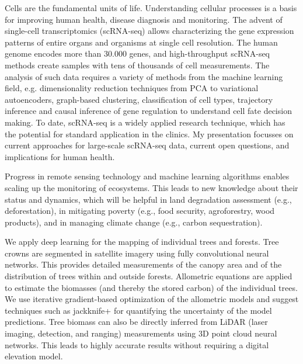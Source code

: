 \license

Cells are the fundamental units of life. Understanding cellular processes is a basis for improving human health, disease diagnosis and monitoring. The advent of single-cell transcriptomics (scRNA-seq) allows characterizing the gene expression patterns of entire organs and organisms at single cell resolution. The human genome encodes more than 30.000 genes, and high-throughput scRNA-seq methods create samples with tens of thousands of cell measurements. The analysis of such data requires a variety of methods from the machine learning field, e.g. dimensionality reduction techniques from PCA to variational autoencoders, graph-based clustering, classification of cell types, trajectory inference and causal inference of gene regulation to understand cell fate decision making. To date, scRNA-seq is a widely applied research technique, which has the potential for standard application in the clinics.  My presentation focusses on current approaches for large-scale scRNA-seq data, current open questions, and implications for human health.

\license
{}

Progress in remote sensing technology and machine learning algorithms enables scaling up the monitoring of ecosystems. This leads to new knowledge about their status and dynamics, which will be helpful in land degradation assessment (e.g., deforestation), in mitigating poverty (e.g., food security, agroforestry, wood products), and in managing climate change (e.g., carbon sequestration).

We apply deep learning for the mapping of individual trees and forests. Tree crowns are segmented in satellite imagery using fully convolutional neural networks. This provides detailed measurements of the canopy area and of the distribution of trees within and outside forests. Allometric equations are applied to estimate the biomasses (and thereby the stored carbon) of the individual trees. We use iterative gradient-based optimization of the allometric models and suggest techniques such as  jackknife+ for quantifying the uncertainty of the model predictions. Tree biomass can also be directly inferred from LiDAR (laser imaging, detection, and ranging) measurements using 3D point cloud neural networks. This leads to highly accurate results without requiring a digital elevation model. 

